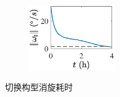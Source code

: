 \documentclass[lang=chs, degree=master, blindreview=false, winfonts=true]{yanputhesis}
\begin{document}
\begin{figure}[htb!]
\begin{minipage}[t]{0.96\textwidth}
\begin{subfigure}[t]{0.23\textwidth}
			\label{fig:posechangedetumb_time(e)}
		\end{subfigure}\hfill
		\begin{subfigure}[t]{0.23\textwidth}
			\centering
			\includegraphics[width = 1.475in]{picture/posechange_omega_norm.eps}
			\caption{ }
			\label{fig:posechangedetumb_time(g)}
		\end{subfigure}
	\end{minipage}
	\caption{切换构型消旋耗时\label{Fig.posechangedetumb_time}}
\end{figure}
\end{document}
